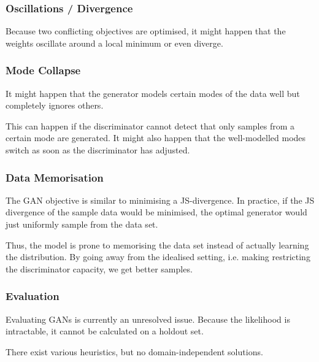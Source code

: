 \subsubsection{Oscillations / Divergence}
Because two conflicting objectives are optimised,
it might happen that the weights oscillate
around a local minimum or even diverge.

\subsubsection{Mode Collapse}
It might happen that the generator models
certain modes of the data well
but completely ignores others.

This can happen if the discriminator
cannot detect that only samples from
a certain mode are generated.
It might also happen that the
well-modelled modes switch as
soon as the discriminator has adjusted.

\subsubsection{Data Memorisation}
The GAN objective is similar to minimising
a JS-divergence.
In practice,
if the JS divergence of the sample data
would be minimised,
the optimal generator would just
uniformly sample from the data set.

Thus, the model is prone to memorising
the data set instead of actually learning the distribution.
By going away from the idealised setting,
i.e. making restricting the discriminator capacity,
we get better samples.

\subsubsection{Evaluation}
Evaluating GANs is currently an unresolved issue.
Because the likelihood is intractable,
it cannot be calculated on a holdout set.

There exist various heuristics,
but no domain-independent solutions.
